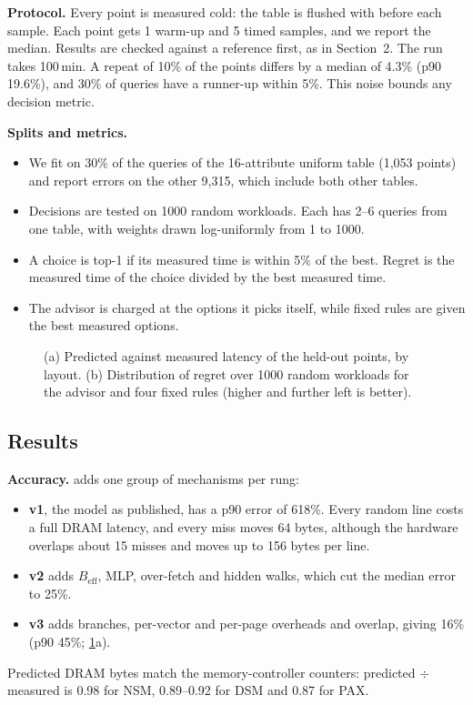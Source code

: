 \textbf{Protocol.} Every point is measured cold: the table is flushed with 
before each sample. Each point gets 1 warm-up and 5 timed samples, and we report the median.
Results are checked against a reference first, as in Section~2. The run takes 100\,min. A
repeat of 10\% of the points differs by a median of 4.3\% (p90 19.6\%), and 30\% of queries
have a runner-up within 5\%. This noise bounds any decision metric.

\textbf{Splits and metrics.}
\begin{itemize}
  \item We fit on 30\% of the queries of the 16-attribute uniform table (1,053 points) and
  report errors on the other 9,315, which include both other tables.
  \item Decisions are tested on 1000 random workloads. Each has 2--6 queries from one table,
  with weights drawn log-uniformly from 1 to 1000.
  \item A choice is top-1 if its measured time is within 5\% of the best. Regret is the
  measured time of the choice divided by the best measured time.
  \item The advisor is charged at the options it picks itself, while fixed rules are given the
  best measured options.
\end{itemize}

\begin{table}[t]
\caption{Model ladder on the 9,315 held-out points (error = predicted $\div$ measured $- 1$)
and the decisions each rung makes on 1000 random workloads (regret).}
\label{tab:ladder}
\small{}
\end{table}

\begin{figure}[t]
\centering
{}
\caption{(a) Predicted against measured latency of the held-out points, by layout.
(b) Distribution of regret over 1000 random workloads for the advisor and four fixed rules
(higher and further left is better).}
\label{fig:advisor}
\end{figure}

\subsection{Results}
\textbf{Accuracy.}  adds one group of mechanisms per rung:
\begin{itemize}
  \item \textbf{v1}, the model as published, has a p90 error of 618\%. Every random line costs
  a full DRAM latency, and every miss moves 64 bytes, although the hardware overlaps about 15
  misses and moves up to 156 bytes per line.
  \item \textbf{v2} adds $B_\mathrm{eff}$, MLP, over-fetch and hidden walks, which cut the
  median error to 25\%.
  \item \textbf{v3} adds branches, per-vector and per-page overheads and overlap, giving 16\%
  (p90 45\%; \cref{fig:advisor}a).
\end{itemize}
Predicted DRAM bytes match the memory-controller counters: predicted $\div$ measured is 0.98
for NSM, 0.89--0.92 for DSM and 0.87 for PAX.

